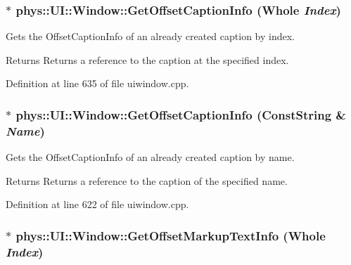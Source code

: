 \hypertarget{classphys_1_1UI_1_1Window_a25dbba29f002817646d4fafd8e2cc905}{
\subsubsection[{GetOffsetCaptionInfo}]{ $\ast$ phys::UI::Window::GetOffsetCaptionInfo ({\bf Whole} {\em Index})}}
\label{d4/d86/classphys_1_1UI_1_1Window_a25dbba29f002817646d4fafd8e2cc905}


Gets the OffsetCaptionInfo of an already created caption by index. 

\begin{DoxyReturn}{Returns}
Returns a reference to the caption at the specified index. 
\end{DoxyReturn}


Definition at line 635 of file uiwindow.cpp.

\hypertarget{classphys_1_1UI_1_1Window_afa081532c017f5e8c4f04bfd2df207b6}{
\subsubsection[{GetOffsetCaptionInfo}]{ $\ast$ phys::UI::Window::GetOffsetCaptionInfo ({\bf ConstString} \& {\em Name})}}
\label{d4/d86/classphys_1_1UI_1_1Window_afa081532c017f5e8c4f04bfd2df207b6}


Gets the OffsetCaptionInfo of an already created caption by name. 

\begin{DoxyReturn}{Returns}
Returns a reference to the caption of the specified name. 
\end{DoxyReturn}


Definition at line 622 of file uiwindow.cpp.

\hypertarget{classphys_1_1UI_1_1Window_a05205cbfec7f8824d0d856047307c799}{
\subsubsection[{GetOffsetMarkupTextInfo}]{ $\ast$ phys::UI::Window::GetOffsetMarkupTextInfo ({\bf Whole} {\em Index})}}
\label{d4/d86/classphys_1_1UI_1_1Window_a05205cbfec7f8824d0d856047307c799}


